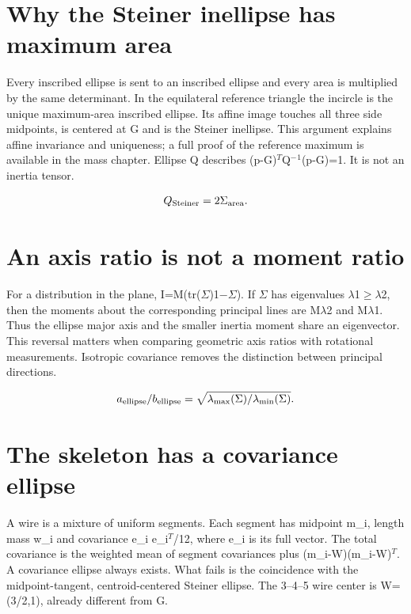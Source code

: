 \documentclass[11pt,oneside,openany]{book}
\begin{document}
\section{Why the Steiner inellipse has maximum area}\label{sec:slide93}

Every inscribed ellipse is sent to an inscribed ellipse and every area is multiplied by the same determinant. In the equilateral reference triangle the incircle is the unique maximum-area inscribed ellipse. Its affine image touches all three side midpoints, is centered at G and is the Steiner inellipse. This argument explains affine invariance and uniqueness; a full proof of the reference maximum is available in the mass chapter. Ellipse Q describes (p-G)\ensuremath{^T}Q\ensuremath{^{-}}\ensuremath{^1}(p-G)=1. It is not an inertia tensor.


\[Q_{\rm Steiner}=2\Sigma_{\rm area}.\]


\section{An axis ratio is not a moment ratio}\label{sec:slide94}

For a distribution in the plane, I=M(tr(\ensuremath{\Sigma})1\ensuremath{-}\ensuremath{\Sigma}). If \ensuremath{\Sigma} has eigenvalues \ensuremath{\lambda}1\ensuremath{\ge}\ensuremath{\lambda}2, then the moments about the corresponding principal lines are M\ensuremath{\lambda}2 and M\ensuremath{\lambda}1. Thus the ellipse major axis and the smaller inertia moment share an eigenvector. This reversal matters when comparing geometric axis ratios with rotational measurements. Isotropic covariance removes the distinction between principal directions.


\[a_{\rm ellipse}/b_{\rm ellipse}=\sqrt{\lambda_{\max}(\Sigma)/\lambda_{\min}(\Sigma)}.\]


\section{The skeleton has a covariance ellipse}\label{sec:slide95}

A wire is a mixture of uniform segments. Each segment has midpoint m\_i, length mass w\_i and covariance e\_i e\_i\ensuremath{^T}/12, where e\_i is its full vector. The total covariance is the weighted mean of segment covariances plus (m\_i-W)(m\_i-W)\ensuremath{^T}. A covariance ellipse always exists. What fails is the coincidence with the midpoint-tangent, centroid-centered Steiner ellipse. The 3--4--5 wire center is W=(3/2,1), already different from G.
\end{document}
